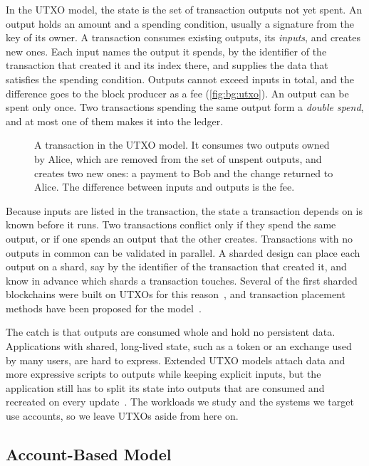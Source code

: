 In the UTXO model, the state is the set of transaction outputs not yet spent.
An output holds an amount and a spending condition, usually a signature from the key of its owner.
A transaction consumes existing outputs, its \emph{inputs}, and creates new ones.
Each input names the output it spends, by the identifier of the transaction that created it and its index there, and supplies the data that satisfies the spending condition.
Outputs cannot exceed inputs in total, and the difference goes to the block producer as a fee (\autoref{fig:bg:utxo}).
An output can be spent only once.
Two transactions spending the same output form a \emph{double spend}, and at most one of them makes it into the ledger.

\begin{figure}[t]
	\centering
	
	\caption{A transaction in the UTXO model.
		It consumes two outputs owned by Alice, which are removed from the set of unspent outputs, and creates two new ones: a payment to Bob and the change returned to Alice.
		The difference between inputs and outputs is the fee.}
	\label{fig:bg:utxo}
\end{figure}

Because inputs are listed in the transaction, the state a transaction depends on is known before it runs.
Two transactions conflict only if they spend the same output, or if one spends an output that the other creates.
Transactions with no outputs in common can be validated in parallel.
A sharded design can place each output on a shard, say by the identifier of the transaction that created it, and know in advance which shards a transaction touches.
Several of the first sharded blockchains were built on UTXOs for this reason~\cite{omniLedger,rapidchain}, and transaction placement methods have been proposed for the model~\cite{Nguyen2019}.

The catch is that outputs are consumed whole and hold no persistent data.
Applications with shared, long-lived state, such as a token or an exchange used by many users, are hard to express.
Extended UTXO models attach data and more expressive scripts to outputs while keeping explicit inputs, but the application still has to split its state into outputs that are consumed and recreated on every update~\cite{chakravarty2020eutxo}.
The workloads we study and the systems we target use accounts, so we leave UTXOs aside from here on.

\subsection{Account-Based Model}\label{sec:bg:state-model:account}

